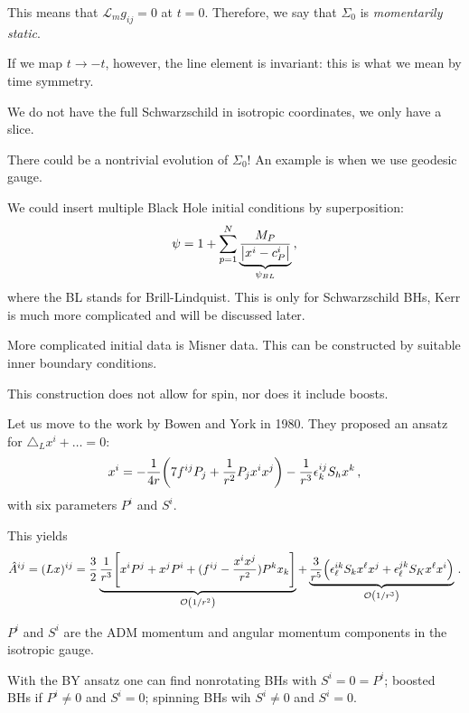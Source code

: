\documentclass[main.tex]{subfiles}
\begin{document}
This means that \(\mathscr{L}_m g_{ij} =0\) at \(t = 0\). 
Therefore, we say that \(\Sigma_0 \) is \emph{momentarily static}. 

If we map \(t \to -t\), however, the line element is invariant: this is what we mean by time symmetry. 

We do not have the full Schwarzschild in isotropic coordinates, we only have a slice.  

There could be a nontrivial evolution of \(\Sigma_0 \)!  
An example is when we use geodesic gauge. 

We could insert multiple Black Hole initial conditions by superposition: 
%
\begin{align}
\psi = 1 + \sum _{p=1}^{N} \underbrace{\frac{M_P}{\abs{x^{i} - c_P^{i}}}}_{\psi_{BL}}
\,,
\end{align}
%
where the BL stands for Brill-Lindquist. 
This is only for Schwarzschild BHs, Kerr is much more complicated and will be discussed later. 

More complicated initial data is Misner data. This can be constructed by suitable inner boundary conditions. 


This construction does not allow for spin, nor does it include boosts. 

Let us move to the work by Bowen and York in 1980. They proposed an ansatz for \(\triangle _L x^{i} + \dots = 0\): 
%
\begin{align}
x^{i} = - \frac{1}{4r} \qty(7 f^{ij} P_j + \frac{1}{r^2} P_j x^{i} x^{j}) - 
\frac{1}{r^3} \epsilon^{ij}_k S_h x^{k}
\,,
\end{align}
%
with six parameters \(P^{i}\) and \(S^{i}\). 

This yields 
%
\begin{align}
\hat{A}^{ij} = (Lx)^{ij} = \frac{3}{2} 
\underbrace{ \frac{1}{r^3} \qty[ x^{i} P^{j} + x^{j} P^{i} + (f^{ij} - \frac{x^{i} x^{j}}{r^2}) P^{k} x_k]}_{\order{1/r^2}} +
\underbrace{\frac{3}{r^{5}} 
\qty( \epsilon^{ik}_\ell S_k x^{\ell} x^{j} + \epsilon^{jk}_\ell S_K x^{\ell} x^{i})}_{\order{1/r^3}}
\,.
\end{align}

\(P^{i}\) and \(S^{i}\) are the ADM momentum and angular momentum components in the isotropic gauge. 


With the BY ansatz one can find nonrotating BHs with \(S^{i} = 0 = P^{i}\); boosted BHs if \(P^{i} \neq 0 \) and \(S^{i} = 0\); spinning BHs wih \(S^{i} \neq 0\) and \(S^{i} = 0\).
\end{document}

